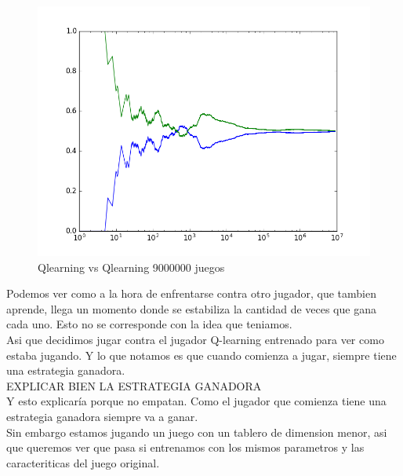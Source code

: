 \begin{figure}[h]
 \centering
 \begin{minipage}{.45\textwidth}	  
	\centering	
	\includegraphics[scale=0.35]{QlearningQlearningEgreedy9000000.png}
        \caption{Qlearning vs Qlearning 9000000 juegos}
  \end{minipage}
\end{figure}


Podemos ver como a la hora de enfrentarse contra otro jugador, que tambien aprende, llega un momento donde se estabiliza la cantidad de veces que gana cada uno. Esto no se corresponde con la idea que teniamos. \\

Asi que decidimos jugar contra el jugador Q-learning entrenado para ver como estaba jugando. Y lo que notamos es que cuando comienza a jugar, siempre tiene una estrategia ganadora.\\
{\huge EXPLICAR BIEN LA ESTRATEGIA GANADORA}\\

Y esto explicaría porque no empatan. Como el jugador que comienza tiene una estrategia ganadora siempre va a ganar.\\


Sin embargo estamos jugando un juego con un tablero de dimension menor, asi que queremos ver que pasa si entrenamos con los mismos parametros y las caracteriticas del juego original.


